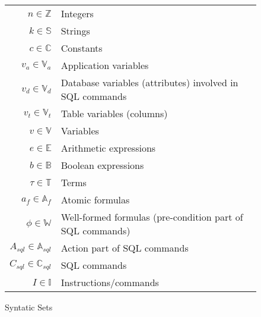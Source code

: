 \begin{figure}[htb!]
     \center
    \begin{tabular}{r p{ }}
    $n \in \mathbb{Z}$                          & Integers                                                   \\
    $k \in \mathbb{S}$                                  & Strings                                                    \\
    $c \in \mathbb{C}$                          & Constants                                                 \\
    $v_a \in \mathbb{V}_a$                      & Application variables                                     \\
    $v_d \in \mathbb{V}_d$                      & Database variables (attributes) involved in SQL commands  \\
    $v_t \in \mathbb{V}_t$                    & Table variables (columns)    \\
    $v \in \mathbb{V}$ & Variables                                                 \\
    $e \in \mathbb{E}$                          & Arithmetic expressions                                    \\
    $b \in \mathbb{B}$                          & Boolean expressions                                       \\
    $\tau \in \mathbb{T}$                       & Terms                                                     \\
    $a_f \in \mathbb{A}_f$                      & Atomic formulas                                           \\
    $\phi  \in \mathbb{W}$                      & Well-formed formulas (pre-condition part of SQL commands) \\
    $A_{sql} \in \mathbb{A}_{sql}$              & Action part of SQL commands                               \\
    $C_{sql} \in \mathbb{C}_{sql}$              & SQL commands                                              \\
    $I \in \mathbb{I}$                          & Instructions/commands                                     \\
    \end{tabular}
    \caption{Syntatic Sets}
    \label{tab:syntatic-sets}
\end{figure}


